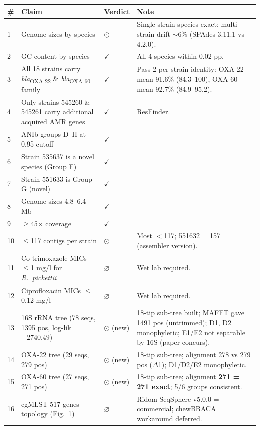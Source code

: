 \documentclass[11pt]{article}
\begin{document}
\begin{longtable}{@{}p{0.7cm}p{7.5cm}p{1.6cm}p{5.4cm}@{}}
\toprule
\# & Claim & Verdict & Note \\
\midrule
\endhead
1  & Genome sizes by species                                    & $\odot$        & Single-strain species exact; multi-strain drift $\sim$6\% (SPAdes 3.11.1 vs 4.2.0). \\
2  & GC content by species                                      & $\checkmark$   & All 4 species within 0.02 pp. \\
3  & All 18 strains carry \emph{bla}\textsubscript{OXA-22} \& \emph{bla}\textsubscript{OXA-60} family & $\checkmark$ & Pass-2 per-strain identity: OXA-22 mean 91.6\% (84.3--100), OXA-60 mean 92.7\% (84.9--95.2). \\
4  & Only strains 545260 \& 545261 carry additional acquired AMR genes & $\checkmark$ & ResFinder. \\
5  & ANIb groups D--H at 0.95 cutoff                            & $\checkmark$   & \\
6  & Strain 535637 is a novel species (Group F)                 & $\checkmark$   & \\
7  & Strain 551633 is Group G (novel)                           & $\checkmark$   & \\
8  & Genome sizes 4.8--6.4 Mb                                   & $\checkmark$   & \\
9  & $\geq$45$\times$ coverage                                 & $\checkmark$   & \\
10 & $\leq$117 contigs per strain                              & $\odot$        & Most $<$117; 551632 = 157 (assembler version). \\
11 & Co-trimoxazole MICs $\leq$1 mg/l for \emph{R.\ pickettii} & $\varnothing$  & Wet lab required. \\
12 & Ciprofloxacin MICs $\leq$0.12 mg/l                        & $\varnothing$  & Wet lab required. \\
13 & 16S rRNA tree (78 seqs, 1395 pos, log-lik $-2740.49$)     & $\odot$ (new)  & 18-tip sub-tree built; MAFFT gave 1491 pos (untrimmed); D1, D2 monophyletic; E1/E2 not separable by 16S (paper concurs). \\
14 & OXA-22 tree (29 seqs, 279 pos)                            & $\odot$ (new)  & 18-tip sub-tree; alignment 278 vs 279 pos ($\Delta$1); D1/D2/E2 monophyletic. \\
15 & OXA-60 tree (27 seqs, 271 pos)                            & $\odot$ (new)  & 18-tip sub-tree; alignment \textbf{271 = 271 exact}; 5/6 groups consistent. \\
16 & cgMLST 517 genes topology (Fig.~1)                        & $\varnothing$  & Ridom SeqSphere v5.0.0 = commercial; chewBBACA workaround deferred. \\
\bottomrule
\end{longtable}
\end{document}
